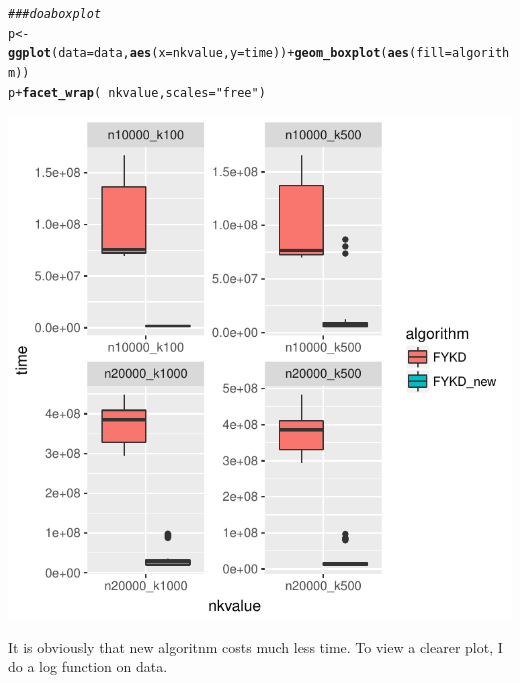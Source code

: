 \documentclass{article}\usepackage[]{graphicx}\usepackage[]{color}
\makeatletter
\def\maxwidth{ %
  \ifdim\Gin@nat@width>\linewidth
    \linewidth
  \else
    \Gin@nat@width
  \fi
}
\newcommand{\hlstr}[1]{\textcolor[rgb]{0.192,0.494,0.8}{#1}}%
\newcommand{\hlcom}[1]{\textcolor[rgb]{0.678,0.584,0.686}{\textit{#1}}}%
\newcommand{\hlopt}[1]{\textcolor[rgb]{0,0,0}{#1}}%
\newcommand{\hlstd}[1]{\textcolor[rgb]{0.345,0.345,0.345}{#1}}%
\newcommand{\hlkwb}[1]{\textcolor[rgb]{0.69,0.353,0.396}{#1}}%
\newcommand{\hlkwc}[1]{\textcolor[rgb]{0.333,0.667,0.333}{#1}}%
\newcommand{\hlkwd}[1]{\textcolor[rgb]{0.737,0.353,0.396}{\textbf{#1}}}%
\newenvironment{kframe}{%
 \def\at@end@of@kframe{}%
 \ifinner\ifhmode%
  \def\at@end@of@kframe{\end{minipage}}%
  \begin{minipage}{\columnwidth}%
 \fi\fi%
 \def\FrameCommand##1{\hskip\@totalleftmargin \hskip-\fboxsep
 \colorbox{shadecolor}{##1}\hskip-\fboxsep
     \hskip-\linewidth \hskip-\@totalleftmargin \hskip\columnwidth}%
 \MakeFramed {\advance\hsize-\width
   \@totalleftmargin\z@ \linewidth\hsize
   \@setminipage}}%
 {\par\unskip\endMakeFramed%
 \at@end@of@kframe}
\newenvironment{knitrout}{}{} %
\makeatother
\begin{document}
\begin{knitrout}
\color{fgcolor}\begin{kframe}
\begin{alltt}
\hlcom{###do a boxplot}
\hlstd{p}\hlkwb{<-}\hlkwd{ggplot}\hlstd{(}\hlkwc{data}\hlstd{=data,} \hlkwd{aes}\hlstd{(}\hlkwc{x}\hlstd{=nkvalue,}\hlkwc{y}\hlstd{=time))}\hlopt{+}\hlkwd{geom_boxplot}\hlstd{(}\hlkwd{aes}\hlstd{(}\hlkwc{fill}\hlstd{=algorithm))}
\hlstd{p}\hlopt{+} \hlkwd{facet_wrap}\hlstd{(}\hlopt{~} \hlstd{nkvalue,} \hlkwc{scales}\hlstd{=}\hlstr{"free"}\hlstd{)}
\end{alltt}
\end{kframe}
\includegraphics[width=\maxwidth]{figure/r-chunk13-1} 

\end{knitrout}
It is obviously that new algoritnm costs much less time. To view a clearer plot, I do a log function on data.
\end{document}
